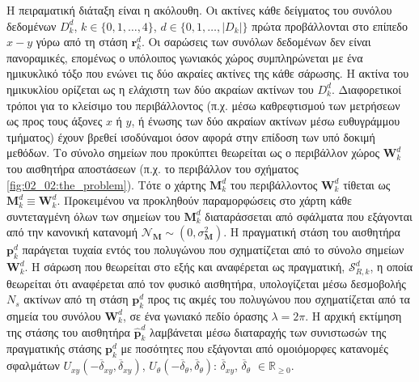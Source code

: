 Η πειραματική διάταξη είναι η ακόλουθη. Οι ακτίνες κάθε δείγματος του συνόλου
δεδομένων $D_k^d$, $k \in \{0,1,\dots,4\}$, $d \in \{0,1,\dots,|D_k|\}$ πρώτα
προβάλλονται στο επίπεδο $x-y$ γύρω από τη στάση $\bm{r}_k^d$. Οι σαρώσεις των
συνόλων δεδομένων δεν είναι πανοραμικές, επομένως ο υπόλοιπος γωνιακός χώρος
συμπληρώνεται με ένα ημικυκλικό τόξο που ενώνει τις δύο ακραίες ακτίνες της
κάθε σάρωσης. Η ακτίνα του ημικυκλίου ορίζεται ως η ελάχιστη των δύο ακραίων
ακτίνων του $D_k^d$. Διαφορετικοί τρόποι για το κλείσιμο του περιβάλλοντος
(π.χ.  μέσω καθρεφτισμού των μετρήσεων ως προς τους άξονες $x$ ή $y$, ή ένωσης
των δύο ακραίων ακτίνων μέσω ευθυγράμμου τμήματος) έχουν βρεθεί ισοδύναμοι όσον
αφορά στην επίδοση των υπό δοκιμή μεθόδων. Το σύνολο σημείων που προκύπτει
θεωρείται ως ο περιβάλλον χώρος $\bm{W}_k^d$ του αισθητήρα αποστάσεων (π.χ.  το
περιβάλλον του σχήματος \ref{fig:02_02:the_problem}). Τότε ο χάρτης
$\bm{M}_k^d$ του περιβάλλοντος $\bm{W}_k^d$ τίθεται ως $\bm{M}_k^d \equiv
\bm{W}_k^d$.  Προκειμένου να προκληθούν παραμορφώσεις στο χάρτη κάθε
συντεταγμένη όλων των σημείων του $\bm{M}_k^d$ διαταράσσεται από σφάλματα που
εξάγονται από την κανονική κατανομή $\mathcal{N}_{\bm{M}} \sim (0,
\sigma_{\bm{M}}^2)$.  Η πραγματική στάση του αισθητήρα $\bm{p}_k^d$ παράγεται
τυχαία εντός του πολυγώνου που σχηματίζεται από το σύνολο σημείων $\bm{W}_k^d$.
Η σάρωση που θεωρείται στο εξής και αναφέρεται ως πραγματική,
$\mathcal{S}_{R,k}^d$, η οποία θεωρείται ότι αναφέρεται από τον φυσικό
αισθητήρα, υπολογίζεται μέσω δεσμοβολής $N_s$ ακτίνων από τη στάση $\bm{p}_k^d$
προς τις ακμές του πολυγώνου που σχηματίζεται από τα σημεία του συνόλου
$\bm{W}_k^d$, σε ένα γωνιακό πεδίο όρασης $\lambda = 2\pi$. Η αρχική εκτίμηση
της στάσης του αισθητήρα $\hat{\bm{p}}_k^d$ λαμβάνεται μέσω διαταραχής των
συνιστωσών της πραγματικής στάσης $\bm{p}^d_k$ με ποσότητες που εξάγονται από
ομοιόμορφες κατανομές σφαλμάτων $U_{xy}(-\overline{\delta}_{xy},
\overline{\delta}_{xy})$, $U_{\theta}(-\overline{\delta}_{\theta},
\overline{\delta}_{\theta})$: $\overline{\delta}_{xy}$,
$\overline{\delta}_\theta$ $\in \mathbb{R}_{\geq 0}$.

